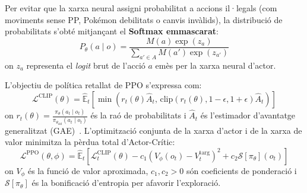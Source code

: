 Per evitar que la xarxa neural assigni probabilitat a accions il·legals (com moviments sense PP, Pokémon debilitats o canvis invàlids), la distribució de probabilitats s'obté mitjançant el \textbf{Softmax emmascarat}:
\begin{equation}
    P_\theta(a \mid o) = \frac{M(a) \exp(z_a)}{\sum_{a' \in A} M(a') \exp(z_{a'})}
    \label{eq:masked_softmax_sec24}
\end{equation}
on $z_a$ representa el \emph{logit} brut de l'acció $a$ emès per la xarxa neural d'actor.

L'objectiu de política retallat de PPO s'expressa com:
\begin{equation}
    \mathcal{L}^{\mathrm{CLIP}}(\theta) = \hat{\mathbb{E}}_t \left[ \min\left( r_t(\theta)\hat{A}_t, \, \text{clip}(r_t(\theta), 1-\epsilon, 1+\epsilon)\hat{A}_t \right) \right]
    \label{eq:ppo_clip_sec24}
\end{equation}
on $r_t(\theta) = \frac{\pi_\theta(a_t \mid o_t)}{\pi_{\theta_{\text{old}}}(a_t \mid o_t)}$ és la raó de probabilitats i $\hat{A}_t$ és l'estimador d'avantatge generalitzat (GAE)~\cite{gae}. L'optimització conjunta de la xarxa d'actor i de la xarxa de valor minimitza la pèrdua total d'Actor-Crític:
\begin{equation}
    \mathcal{L}^{\mathrm{PPO}}(\theta, \phi) = \hat{\mathbb{E}}_t \left[ \mathcal{L}^{\mathrm{CLIP}}_t(\theta) - c_1 \left( V_\phi(o_t) - V_t^{\mathrm{targ}} \right)^2 + c_2 \mathcal{S}[\pi_\theta](o_t) \right]
    \label{eq:ppo_total_loss}
\end{equation}
on $V_\phi$ és la funció de valor aproximada, $c_1, c_2 > 0$ són coeficients de ponderació i $\mathcal{S}[\pi_\theta]$ és la bonificació d'entropia per afavorir l'exploració.

